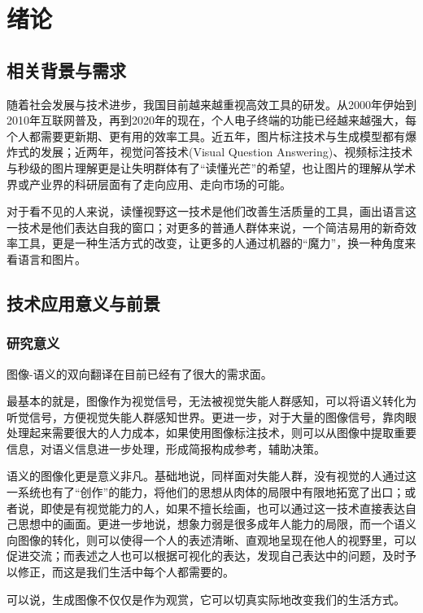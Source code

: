 
\chapter{绪论}

\section{相关背景与需求}
随着社会发展与技术进步，我国目前越来越重视高效工具的研发。从2000年伊始到2010年互联网普及，再到2020年的现在，个人电子终端的功能已经越来越强大，每个人都需要更新期、更有用的效率工具。近五年，图片标注技术与生成模型都有爆炸式的发展；近两年，视觉问答技术(Visual Question Answering)、视频标注技术与秒级的图片理解更是让失明群体有了“读懂光芒”的希望，也让图片的理解从学术界或产业界的科研层面有了走向应用、走向市场的可能。

对于看不见的人来说，读懂视野这一技术是他们改善生活质量的工具，画出语言这一技术是他们表达自我的窗口；对更多的普通人群体来说，一个简洁易用的新奇效率工具，更是一种生活方式的改变，让更多的人通过机器的“魔力”，换一种角度来看语言和图片。

\section{技术应用意义与前景}

\subsection{研究意义}
图像-语义的双向翻译在目前已经有了很大的需求面。

最基本的就是，图像作为视觉信号，无法被视觉失能人群感知，可以将语义转化为听觉信号，方便视觉失能人群感知世界。更进一步，对于大量的图像信号，靠肉眼处理起来需要很大的人力成本，如果使用图像标注技术，则可以从图像中提取重要信息，对语义信息进一步处理，形成简报构成参考，辅助决策。

语义的图像化更是意义非凡。基础地说，同样面对失能人群，没有视觉的人通过这一系统也有了“创作”的能力，将他们的思想从肉体的局限中有限地拓宽了出口；或者说，即使是有视觉能力的人，如果不擅长绘画，也可以通过这一技术直接表达自己思想中的画面。更进一步地说，想象力弱是很多成年人能力的局限，而一个语义向图像的转化，则可以使得一个人的表述清晰、直观地呈现在他人的视野里，可以促进交流；而表述之人也可以根据可视化的表达，发现自己表达中的问题，及时予以修正，而这是我们生活中每个人都需要的。

可以说，生成图像不仅仅是作为观赏，它可以切真实际地改变我们的生活方式。

